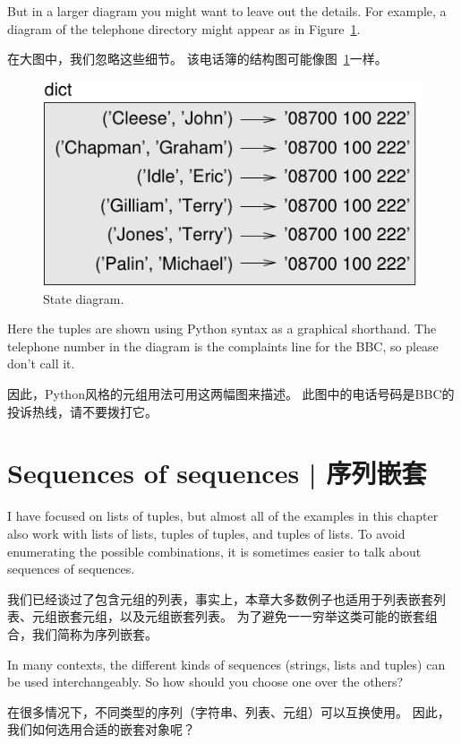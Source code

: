 But in a larger diagram you might want to leave out the
details.  For example, a diagram of the telephone directory might
appear as in Figure~\ref{fig.dict2}.

在大图中，我们忽略这些细节。 该电话簿的结构图可能像图~\ref{fig.dict2}一样。

\begin{figure}
\centerline
{\includegraphics[scale=0.8]{figs/dict2.pdf}}
\caption{State diagram.}
\label{fig.dict2}
\end{figure}

Here the tuples are shown using Python syntax as a graphical
shorthand.  The telephone number in the diagram is the complaints line
for the BBC, so please don't call it.

因此，Python风格的元组用法可用这两幅图来描述。 此图中的电话号码是BBC的投诉热线，请不要拨打它。


\section{Sequences of sequences | 序列嵌套}

I have focused on lists of tuples, but almost all of the examples in
this chapter also work with lists of lists, tuples of tuples, and
tuples of lists.  To avoid enumerating the possible combinations, it
is sometimes easier to talk about sequences of sequences.

我们已经谈过了包含元组的列表，事实上，本章大多数例子也适用于列表嵌套列表、元组嵌套元组，以及元组嵌套列表。 为了避免一一穷举这类可能的嵌套组合，我们简称为序列嵌套。

In many contexts, the different kinds of sequences (strings, lists and
tuples) can be used interchangeably.  So how should you choose one
over the others?

在很多情况下，不同类型的序列（字符串、列表、元组）可以互换使用。 因此，我们如何选用合适的嵌套对象呢？
   

